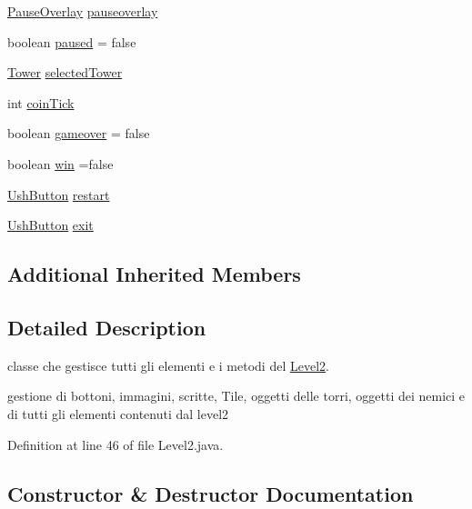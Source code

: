 \begin{DoxyCompactItemize}
\hyperlink{classui_1_1_pause_overlay}{Pause\+Overlay} \hyperlink{classscenes_1_1_level2_a544fb9294d892e35b4b0316e07997cd6}{pauseoverlay}
\item 
boolean \hyperlink{classscenes_1_1_level2_aa1e43f4bcbc826434b83c0f3ec507143}{paused} = false
\item 
\hyperlink{classtowers_1_1_tower}{Tower} \hyperlink{classscenes_1_1_level2_af6b1162bc2f00f8d549aae075ddd5a8b}{selected\+Tower}
\item 
int \hyperlink{classscenes_1_1_level2_aa48bc6c9a2648651d6484c9063ca1b8f}{coin\+Tick}
\item 
boolean \hyperlink{classscenes_1_1_level2_a962cec751fe966ea7bf381c68ab5c70f}{gameover} = false
\item 
boolean \hyperlink{classscenes_1_1_level2_a1cc7b399bb950a160021766cd9a126f8}{win} =false
\item 
\hyperlink{classui_1_1_ush_button}{Ush\+Button} \hyperlink{classscenes_1_1_level2_ac1d34384911014e49613ccfb1abddbcc}{restart}
\item 
\hyperlink{classui_1_1_ush_button}{Ush\+Button} \hyperlink{classscenes_1_1_level2_a08590df28bf721b1cf1670cf0f8f7341}{exit}
\end{DoxyCompactItemize}
\subsection*{Additional Inherited Members}


\subsection{Detailed Description}
classe che gestisce tutti gli elementi e i metodi del \hyperlink{classscenes_1_1_level2}{Level2}. 

gestione di bottoni, immagini, scritte, Tile, oggetti delle torri, oggetti dei nemici e di tutti gli elementi contenuti dal level2 

Definition at line 46 of file Level2.\+java.



\subsection{Constructor \& Destructor Documentation}
\mbox{\label{classscenes_1_1_level2_a53060fc6a453b337e408bd89a86e32af}} 
